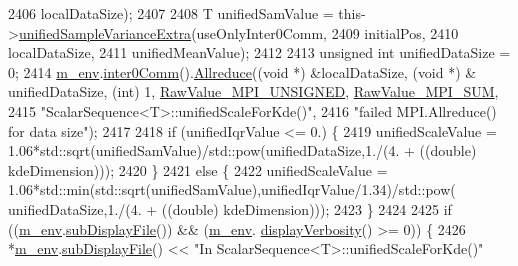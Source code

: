 \begin{DoxyCode}
2406                                                   localDataSize);
2407 
2408       T unifiedSamValue = this->\hyperlink{class_q_u_e_s_o_1_1_scalar_sequence_a132654b8d4d733f77c37b868c9c9684a}{unifiedSampleVarianceExtra}(useOnlyInter0Comm,
2409                                                            initialPos,
2410                                                            localDataSize,
2411                                                            unifiedMeanValue);
2412 
2413       \textcolor{keywordtype}{unsigned} \textcolor{keywordtype}{int} unifiedDataSize = 0;
2414       \hyperlink{class_q_u_e_s_o_1_1_scalar_sequence_a71618cd6351b29361b437af68447a4c8}{m\_env}.\hyperlink{class_q_u_e_s_o_1_1_base_environment_a689e4d140c74d495d97eb498714a4b82}{inter0Comm}().\hyperlink{class_q_u_e_s_o_1_1_mpi_comm_a72e137e60ef8060efb1ee5fc874fa4b8}{Allreduce}((\textcolor{keywordtype}{void} *) &localDataSize, (\textcolor{keywordtype}{void} *) &
      unifiedDataSize, (\textcolor{keywordtype}{int}) 1, \hyperlink{_mpi_comm_8h_a06cbfbc33436f6e0dc8a48ff3c49bdfc}{RawValue\_MPI\_UNSIGNED}, \hyperlink{_mpi_comm_8h_afbf78d291c032aa7f512bc566cee2bd1}{RawValue\_MPI\_SUM},
2415                                    \textcolor{stringliteral}{"ScalarSequence<T>::unifiedScaleForKde()"},
2416                                    \textcolor{stringliteral}{"failed MPI.Allreduce() for data size"});
2417 
2418       \textcolor{keywordflow}{if} (unifiedIqrValue <= 0.) \{
2419         unifiedScaleValue = 1.06*std::sqrt(unifiedSamValue)/std::pow(unifiedDataSize,1./(4. + ((\textcolor{keywordtype}{double}) 
      kdeDimension)));
2420       \}
2421       \textcolor{keywordflow}{else} \{
2422         unifiedScaleValue = 1.06*std::min(std::sqrt(unifiedSamValue),unifiedIqrValue/1.34)/std::pow(
      unifiedDataSize,1./(4. + ((\textcolor{keywordtype}{double}) kdeDimension)));
2423       \}
2424 
2425       \textcolor{keywordflow}{if} ((\hyperlink{class_q_u_e_s_o_1_1_scalar_sequence_a71618cd6351b29361b437af68447a4c8}{m\_env}.\hyperlink{class_q_u_e_s_o_1_1_base_environment_a8a0064746ae8dddfece4229b9ad374d6}{subDisplayFile}()) && (\hyperlink{class_q_u_e_s_o_1_1_scalar_sequence_a71618cd6351b29361b437af68447a4c8}{m\_env}.
      \hyperlink{class_q_u_e_s_o_1_1_base_environment_a1fe5f244fc0316a0ab3e37463f108b96}{displayVerbosity}() >= 0)) \{
2426         *\hyperlink{class_q_u_e_s_o_1_1_scalar_sequence_a71618cd6351b29361b437af68447a4c8}{m\_env}.\hyperlink{class_q_u_e_s_o_1_1_base_environment_a8a0064746ae8dddfece4229b9ad374d6}{subDisplayFile}() << \textcolor{stringliteral}{"In ScalarSequence<T>::unifiedScaleForKde()"}

\end{DoxyCode}
